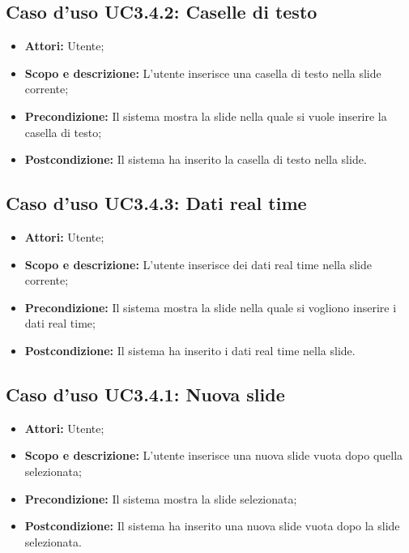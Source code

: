 \subsection{Caso d'uso UC3.4.2: Caselle di testo}
\begin{itemize}
	\item \textbf{Attori:} Utente;
	\item \textbf{Scopo e descrizione:} L'utente inserisce una casella di testo nella slide corrente;
	\item \textbf{Precondizione:} Il sistema mostra la slide nella quale si vuole inserire la casella di testo;
	\item \textbf{Postcondizione:} Il sistema ha inserito la casella di testo nella slide.
\end{itemize}

\subsection{Caso d'uso UC3.4.3: Dati real time}
\begin{itemize}
	\item \textbf{Attori:} Utente;
	\item \textbf{Scopo e descrizione:} L'utente inserisce dei dati real time nella slide corrente;
	\item \textbf{Precondizione:} Il sistema mostra la slide nella quale si vogliono inserire i dati real time;
	\item \textbf{Postcondizione:} Il sistema ha inserito i dati real time nella slide.
\end{itemize}

\subsection{Caso d'uso UC3.4.1: Nuova slide}
\begin{itemize}
	\item \textbf{Attori:} Utente;
	\item \textbf{Scopo e descrizione:} L'utente inserisce una nuova slide vuota dopo quella selezionata;
	\item \textbf{Precondizione:} Il sistema mostra la slide selezionata;
	\item \textbf{Postcondizione:} Il sistema ha inserito una nuova slide vuota dopo la slide selezionata.
\end{itemize}